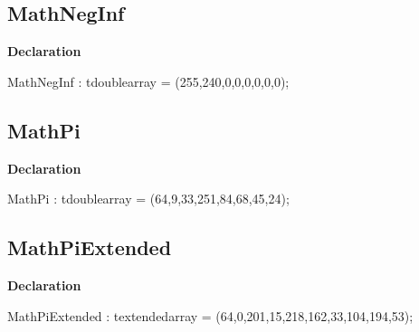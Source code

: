 \documentclass{report}
\begin{document}
\subsection*{MathNegInf}
\begin{list}{}{
\setlength{\itemindent}{0cm}
\setlength{\listparindent}{0cm}
\setlength{\leftmargin}{\evensidemargin}
\addtolength{\leftmargin}{\tmplength}
\settowidth{\labelsep}{X}
\addtolength{\leftmargin}{\labelsep}
\setlength{\labelwidth}{\tmplength}
}
\begin{flushleft}
\item[\textbf{Declaration}\hfill]
\begin{ttfamily}
MathNegInf : tdoublearray = (255,240,0,0,0,0,0,0);\end{ttfamily}


\end{flushleft}
\end{list}
\subsection*{MathPi}
\begin{list}{}{
\setlength{\itemindent}{0cm}
\setlength{\listparindent}{0cm}
\setlength{\leftmargin}{\evensidemargin}
\addtolength{\leftmargin}{\tmplength}
\settowidth{\labelsep}{X}
\addtolength{\leftmargin}{\labelsep}
\setlength{\labelwidth}{\tmplength}
}
\begin{flushleft}
\item[\textbf{Declaration}\hfill]
\begin{ttfamily}
MathPi : tdoublearray =  (64,9,33,251,84,68,45,24);\end{ttfamily}


\end{flushleft}
\end{list}
\subsection*{MathPiExtended}
\begin{list}{}{
\setlength{\itemindent}{0cm}
\setlength{\listparindent}{0cm}
\setlength{\leftmargin}{\evensidemargin}
\addtolength{\leftmargin}{\tmplength}
\settowidth{\labelsep}{X}
\addtolength{\leftmargin}{\labelsep}
\setlength{\labelwidth}{\tmplength}
}
\begin{flushleft}
\item[\textbf{Declaration}\hfill]
\begin{ttfamily}
MathPiExtended : textendedarray = (64,0,201,15,218,162,33,104,194,53);\end{ttfamily}


\end{flushleft}
\end{list}
\end{document}
